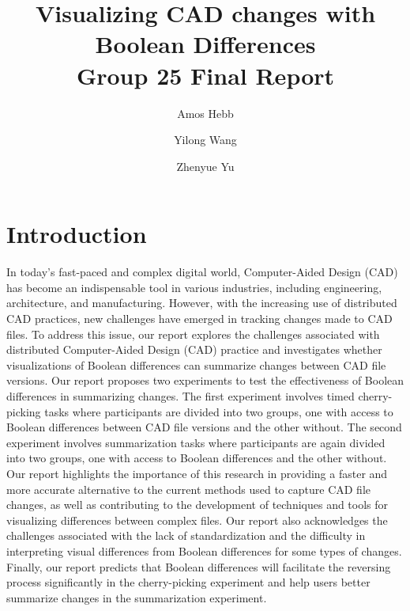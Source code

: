 \documentclass[sigconf,authorversion,nonacm]{acmart}
\begin{document}
\title[Visualizing CAD changes with Boolean Differences]
{Visualizing CAD changes with Boolean Differences\\
	\normalsize{Group 25 Final Report}}

\author{Amos Hebb}
\author{Yilong Wang}
\author{Zhenyue Yu}

\makeatletter
\def\@ACM@checkaffil{%
	\if@ACM@instpresent\else
		\ClassWarningNoLine{\@classname}{No institution present for an affiliation}%
	\fi
	\if@ACM@citypresent\else
		\ClassWarningNoLine{\@classname}{No city present for an affiliation}%
	\fi
	\if@ACM@countrypresent\else
		\ClassWarningNoLine{\@classname}{No country present for an affiliation}%
	\fi
}
\makeatother

\maketitle

\section{Introduction}

In today's fast-paced and complex digital world, Computer-Aided Design (CAD) has become an indispensable tool in various industries, including engineering, architecture, and manufacturing. 
However, with the increasing use of distributed CAD practices, new challenges have emerged in tracking changes made to CAD files. 
To address this issue, our report explores the challenges associated with distributed Computer-Aided Design (CAD) practice and investigates whether visualizations of Boolean differences can summarize changes between CAD file versions. 
Our report proposes two experiments to test the effectiveness of Boolean differences in summarizing changes. The first experiment involves timed cherry-picking tasks where participants are divided into two groups, one with access to Boolean differences between CAD file versions and the other without. 
The second experiment involves summarization tasks where participants are again divided into two groups, one with access to Boolean differences and the other without. 
Our report highlights the importance of this research in providing a faster and more accurate alternative to the current methods used to capture CAD file changes, as well as contributing to the development of techniques and tools for visualizing differences between complex files. Our report also acknowledges the challenges associated with the lack of standardization and the difficulty in interpreting visual differences from Boolean differences for some types of changes. 
Finally, our report predicts that Boolean differences will facilitate the reversing process significantly in the cherry-picking experiment and help users better summarize changes in the summarization experiment.
\end{document}
